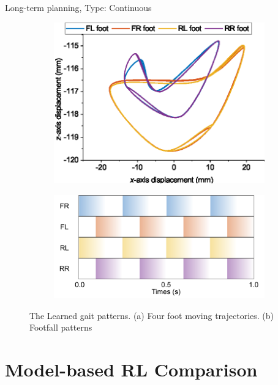 Long-term planning, Type: Continuous
\begin{figure}[htb]
    \centering
    \begin{subfigure}[b]{0.45\textwidth}
    \centering
    \includegraphics[width=\linewidth]{img/chap5/foot_trace.eps}
    \caption{}
    \end{subfigure}
    \begin{subfigure}[b]{0.45\textwidth}
    \centering
    \includegraphics[width=\linewidth]{img/chap5/pattern.pdf}
    \caption{}
    \end{subfigure}
    \caption{The Learned gait patterns. (a) Four foot moving trajectories. (b) Footfall patterns}
    \label{fig:CT_gait}
\end{figure}


\section{Model-based RL Comparison}
\label{Sec:MBRL}

